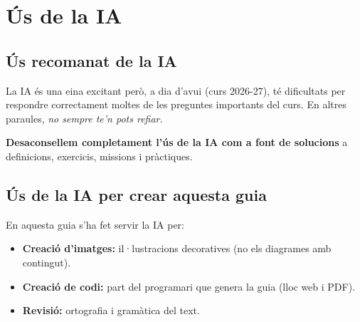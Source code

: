 \newpage

\section*{Ús de la IA}

\subsection*{Ús recomanat de la IA}

\noindent La IA és una eina excitant però, a dia d'avui (curs 2026-27), té dificultats per respondre correctament moltes de les preguntes importants del curs. En altres paraules, \textit{no sempre te'n pots refiar}.

\textbf{Desaconsellem completament l'ús de la IA com a font de solucions} a definicions, exercicis, missions i pràctiques.

\subsection*{Ús de la IA per crear aquesta guia}

\noindent En aquesta guia s'ha fet servir la IA per:

\begin{itemize}
\item \textbf{Creació d'imatges:} il·lustracions decoratives (no els diagrames amb contingut).
\item \textbf{Creació de codi:} part del programari que genera la guia (lloc web i PDF).
\item \textbf{Revisió:} ortografia i gramàtica del text.
\end{itemize}

\begin{center}
\end{center}


